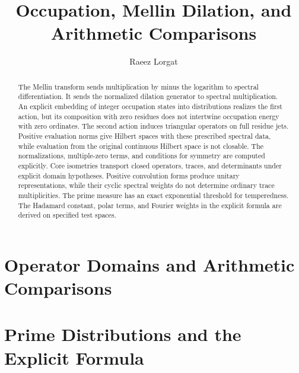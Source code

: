 \documentclass[11pt]{memoir}
\title{Occupation, Mellin Dilation, and Arithmetic Comparisons}
\author{Raeez Lorgat}
\date{}
\begin{document}
\maketitle
\begin{abstract}
The Mellin transform sends multiplication by minus the logarithm to
spectral differentiation. It sends the normalized dilation generator
to spectral multiplication. An explicit embedding of integer
occupation states into distributions realizes the first action, but
its composition with zero residues does not intertwine occupation
energy with zero ordinates. The second action induces triangular
operators on full residue jets. Positive evaluation norms give
Hilbert spaces with these prescribed spectral data, while evaluation
from the original continuous Hilbert space is not closable. The
normalizations, multiple-zero terms, and conditions for symmetry are
computed explicitly.
Core isometries transport closed operators, traces, and determinants
under explicit domain hypotheses. Positive convolution forms produce
unitary representations, while their cyclic spectral weights do not
determine ordinary trace multiplicities.
The prime measure has an exact exponential threshold for temperedness.
The Hadamard constant, polar terms, and Fourier weights in the explicit
formula are derived on specified test spaces.
\end{abstract}


\chapter{Operator Domains and Arithmetic Comparisons}


\chapter{Prime Distributions and the Explicit Formula}


\end{document}
